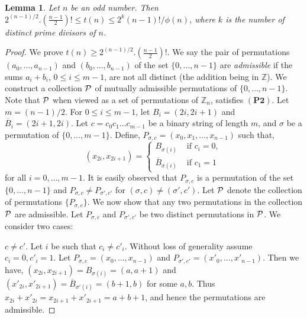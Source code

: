 \documentclass[12pt]{article}
\newcommand{\mb}{\mathbb}
\newtheorem{lemma}[defn]{{\bf Lemma}}
\begin{document}
\begin{lemma}\label{lem:nonp}
Let $n$ be an odd number. Then $2^{(n-1)/2}.(\frac{n-1}{2})!\leq t(n)\leq
2^k(n-1)!/\phi(n)$, where $k$ is the number of distinct prime divisors of
$n$.
\end{lemma}
\begin{proof}
We prove $t(n)\geq 2^{(n-1)/2}.(\frac{n-1}{2})!$. We say the pair of 
permutations $(a_0,\ldots,a_{n-1})$ and $(b_0,\ldots,b_{n-1})$ of the set
$\{0,\ldots,n-1\}$ are {\em admissible} if the sums $a_i+b_i$, $0\leq i\leq
m-1$, are not all distinct 
(the addition being in $\mb{Z}$). We construct a collection ${\cal P}$ of mutually
admissible permutations of $\{0,\ldots,n-1\}$. Note that ${\cal P}$ when
viewed as a set of permutations of $\mb{Z}_n$, satisfies $\mathbf{(P2)}$.
Let $m=(n-1)/2$. For $0\leq i\leq m-1$, let $B_i=(2i,2i+1)$ and
$\overline{B}_i=(2i+1,2i)$. Let $c=c_0c_1\ldots c_{m-1}$ be a binary string
of length $m$, and $\sigma$ be a permutation of $\{0,\ldots,m-1\}$. Define,
$P_{\sigma,c} = (x_0,x_1,\ldots,x_{n-1})$ such that,
\begin{equation*}
(x_{2i},x_{2i+1})=\begin{cases}
					B_{\sigma(i)} & \text{ if } c_i=0, \\
					\overline{B}_{\sigma(i)} & \text{ if } c_1=1 
\end{cases}
\end{equation*}
for all $i=0,\ldots,m-1$. It is easily observed that $P_{\sigma,c}$ is a
permutation of the set $\{0,\ldots,n-1\}$ and $P_{\sigma,c}\neq
P_{\sigma',c'}$ for $(\sigma,c) \neq (\sigma',c')$. Let ${\cal P}$
denote the collection of permutations $\{P_{\sigma,c}\}$. We now show that
any two permutations in the collection ${\cal P}$ are admissible. Let
$P_{\sigma,c}$ and $P_{\sigma',c'}$ be two distinct permutations in ${\cal
P}$. We consider two cases: \smallskip

 $c\neq c'$. Let $i$ be such that $c_i\neq c'_i$.
Without loss of generality assume $c_i=0, c'_i=1$. Let
$P_{\sigma,c}=(x_0,\ldots,x_{n-1})$ and
$P_{\sigma',c'}=(x'_0,\ldots,x'_{n-1})$. Then we have,
$(x_{2i},x_{2i+1})=B_{\sigma(i)} = (a,a+1)$ and
$(x'_{2i},x'_{2i+1})=\overline{B}_{\sigma'(i)} = (b+1,b)$ for some $a,b$.
Thus $x_{2i}+x'_{2i}=x_{2i+1}+x'_{2i+1}=a+b+1$, and hence the permutations
are admissible. 


\end{proof}
\end{document}
